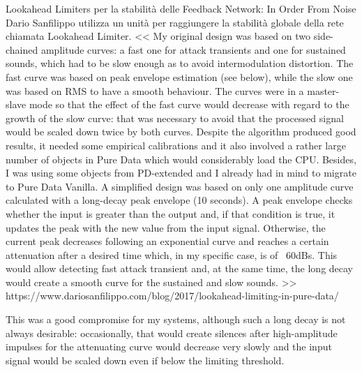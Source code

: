 Lookahead Limiters per la stabilità delle Feedback Network:
In Order From Noise Dario Sanfilippo utilizza un unità per raggiungere la stabilità
globale della rete chiamata Lookahead Limiter.
<< My original design was based on two side-chained amplitude curves: 
a fast one for attack transients and one for sustained sounds, which had 
to be slow enough as to avoid intermodulation distortion. The fast curve 
was based on peak envelope estimation (see below), while the slow one was based on 
RMS to have a smooth behaviour. The curves were in a master-slave mode so that 
the effect of the fast curve would decrease with regard to the growth of the slow curve: 
that was necessary to avoid that the processed signal would be scaled down twice by both curves. 
Despite the algorithm produced good results, it needed some empirical calibrations 
and it also involved a rather large number of objects in Pure Data which would considerably load the CPU. 
Besides, I was using some objects from PD-extended and I already had in mind to migrate to Pure Data Vanilla.
A simplified design was based on only one amplitude curve calculated with a long-decay peak envelope (10 seconds). 
A peak envelope checks whether the input is greater than the output and, if that condition is true, 
it updates the peak with the new value from the input signal. 
Otherwise, the current peak decreases following an exponential curve and reaches a certain 
attenuation after a desired time which, in my specific case, is of ~60dBs. 
This would allow detecting fast attack transient and, at the same time, 
the long decay would create a smooth curve for the sustained and slow sounds. >>
https://www.dariosanfilippo.com/blog/2017/lookahead-limiting-in-pure-data/

This was a good compromise for my systems, although such a long decay is not always desirable: occasionally, 
that would create silences after high-amplitude impulses for the attenuating curve 
would decrease very slowly and the input signal would be scaled down even if below the limiting threshold.